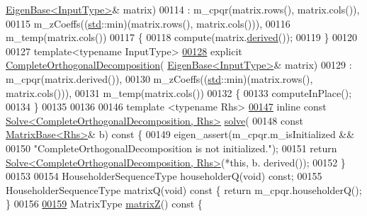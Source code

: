 \begin{DoxyCode}
      \hyperlink{group___core___module_struct_eigen_1_1_eigen_base}{EigenBase<InputType>}& matrix)
00114       : m\_cpqr(matrix.rows(), matrix.cols()),
00115         m\_zCoeffs((\hyperlink{namespacestd}{std}::min)(matrix.rows(), matrix.cols())),
00116         m\_temp(matrix.cols())
00117   \{
00118     compute(matrix.\hyperlink{group___core___module_a324b16961a11d2ecfd2d1b7dd7946545}{derived}());
00119   \}
00120 
00127   \textcolor{keyword}{template}<\textcolor{keyword}{typename} InputType>
\hyperlink{group___q_r___module_a082295ba2aac35a8b8b9e2d46e1d7ce4}{00128}   \textcolor{keyword}{explicit} \hyperlink{group___q_r___module_a082295ba2aac35a8b8b9e2d46e1d7ce4}{CompleteOrthogonalDecomposition}(
      \hyperlink{group___core___module_struct_eigen_1_1_eigen_base}{EigenBase<InputType>}& matrix)
00129     : m\_cpqr(matrix.derived()),
00130       m\_zCoeffs((\hyperlink{namespacestd}{std}::min)(matrix.rows(), matrix.cols())),
00131       m\_temp(matrix.cols())
00132   \{
00133     computeInPlace();
00134   \}
00135 
00136 
00146   \textcolor{keyword}{template} <\textcolor{keyword}{typename} Rhs>
\hyperlink{group___q_r___module_ab303e177cc7df17e435c79dca9ef5654}{00147}   \textcolor{keyword}{inline} \textcolor{keyword}{const} \hyperlink{group___core___module_class_eigen_1_1_solve}{Solve<CompleteOrthogonalDecomposition, Rhs>} 
      \hyperlink{group___q_r___module_ab303e177cc7df17e435c79dca9ef5654}{solve}(
00148       \textcolor{keyword}{const} \hyperlink{group___core___module_class_eigen_1_1_matrix_base}{MatrixBase<Rhs>}& b)\textcolor{keyword}{ const }\{
00149     eigen\_assert(m\_cpqr.m\_isInitialized &&
00150                  \textcolor{stringliteral}{"CompleteOrthogonalDecomposition is not initialized."});
00151     \textcolor{keywordflow}{return} \hyperlink{group___core___module_class_eigen_1_1_solve}{Solve<CompleteOrthogonalDecomposition, Rhs>}(*\textcolor{keyword}{this}, b.
      derived());
00152   \}
00153 
00154   HouseholderSequenceType householderQ(\textcolor{keywordtype}{void}) \textcolor{keyword}{const};
00155   HouseholderSequenceType matrixQ(\textcolor{keywordtype}{void})\textcolor{keyword}{ const }\{ \textcolor{keywordflow}{return} m\_cpqr.householderQ(); \}
00156 
\hyperlink{group___q_r___module_a4cd178f13aefe5189d4beeb3eb1c5897}{00159}   MatrixType \hyperlink{group___q_r___module_a4cd178f13aefe5189d4beeb3eb1c5897}{matrixZ}()\textcolor{keyword}{ const }\{

\end{DoxyCode}
